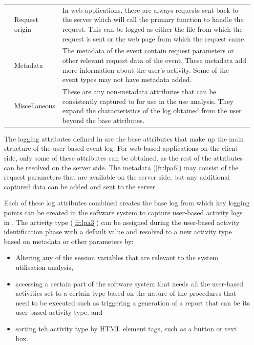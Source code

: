 \begin{xltabular}{\textwidth}{llX}
     & Request origin & In web applications, there are always requests sent back to the server which will call the primary function to handle the request. This can be logged as either the file from which the request is sent or the web page from which the request came. \\ 

	 & Metadata & The metadata of the event contain request parameters or other relevant request data of the event. These metadata add more information about the user's activity. Some of the event types may not have metadata added. \\

     & Miscellaneous & These are any non-metadata attributes that can be consistently captured to for use in the use analysis. They expand the characteristics of the log obtained from the user beyond the base attributes. \\ 
    \bottomrule
\end{xltabular}

The logging attributes defined in  are the base attributes that make up the main structure of the user-based event log. For web-based applications on the client side, only some of these attributes can be obtained, as the rest of the attributes can be resolved on the server side. The metadata (\ref{fr:lpa6}) may consist of the request parameters that are available on the server side, but any additional captured data can be added and sent to the server. \par Each of these log attributes combined creates the base log from which key logging points can be created in the software system to capture user-based activity logs in . The activity type (\ref{fr:lpa3}) can be assigned during the user-based activity identification phase with a default value and resolved to a new activity type based on metadata or other parameters by:

\begin{itemize}
	\item Altering any of the session variables that are relevant to the system utilisation analysis,
	\item accessing a certain part of the software system that needs all the user-based activities set to a certain type based on the nature of the procedures that need to be executed such as triggering a generation of a report that can be its user-based activity type, and
	\item sorting teh activity type by HTML element tags, such as a button or text box.
\end{itemize}

